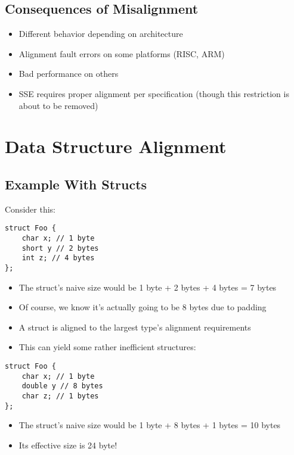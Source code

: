 \documentclass[a4paper,12pt]{scrartcl}
\begin{document}
\subsection{Consequences of Misalignment}
\begin{itemize}
    \item Different behavior depending on architecture
    \item Alignment fault errors on some platforms (RISC, ARM)
    \item Bad performance on others
    \item SSE requires proper alignment per specification (though this restriction is about to be removed)
\end{itemize}

\section{Data Structure Alignment}
\subsection{Example With Structs}
Consider this:
\begin{verbatim}
struct Foo {
    char x; // 1 byte
    short y // 2 bytes
    int z; // 4 bytes
};
\end{verbatim}
\begin{itemize}
    \item The struct's naive size would be 1 byte + 2 bytes + 4 bytes = 7 bytes
    \item Of course, we know it's actually going to be 8 bytes due to padding
\end{itemize}

\begin{itemize}
    \item A struct is aligned to the largest type's alignment requirements
    \item This can yield some rather inefficient structures:
\end{itemize}
\begin{verbatim}
struct Foo {
    char x; // 1 byte
    double y // 8 bytes
    char z; // 1 bytes
};
\end{verbatim}
\begin{itemize}
    \item The struct's naive size would be 1 byte + 8 bytes + 1 bytes = 10 bytes
    \item Its effective size is 24 byte!
\end{itemize}
\end{document}
